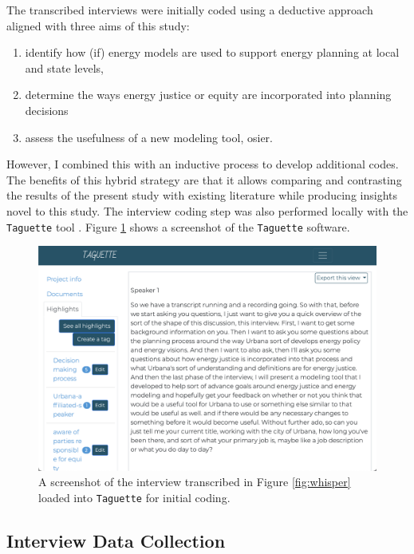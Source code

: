 The transcribed interviews were initially coded using a deductive approach
aligned with three aims of this study:
\begin{enumerate}
    \item identify how (if) energy models are used to support energy planning at
    local and state levels,
    \item determine the ways energy justice or equity are incorporated into
    planning decisions
    \item assess the usefulness of a new modeling tool, \ac{osier}.
\end{enumerate} 
However, I combined this with an inductive process to develop additional codes.
The benefits of this hybrid strategy are that it allows comparing and
contrasting the results of the present study with existing literature while
producing insights novel to this study. The interview coding step was also
performed locally with the \texttt{Taguette} tool \cite{rampin_taguette_2021}.
Figure \ref{fig:taguette} shows a screenshot of the \texttt{Taguette} software.

\begin{figure}[htbp!]
    \centering
    \includegraphics[width=0.75\columnwidth]{figures/07_interview_chapter/taguette-screenshot}
    \caption{A screenshot of the interview transcribed in Figure \ref{fig:whisper}
    loaded into \texttt{Taguette} for initial coding.}
    \label{fig:taguette}
\end{figure}

\subsection{Interview Data Collection}

